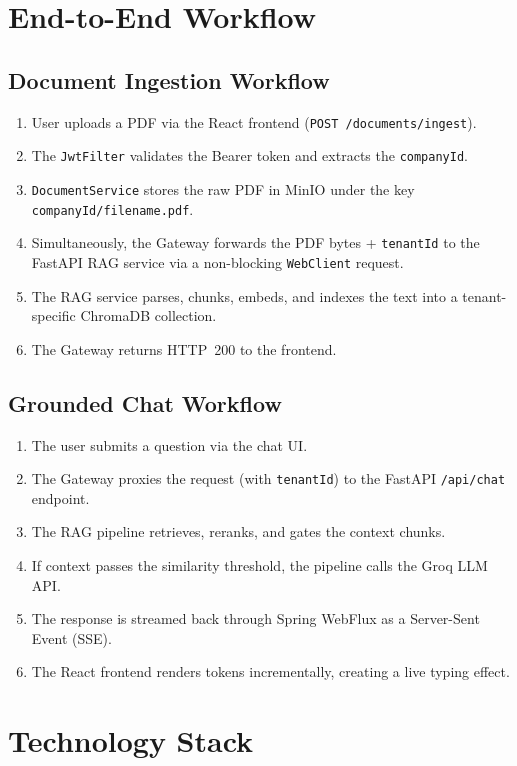 \documentclass[12pt,a4paper]{report}
\begin{document}
\section{End-to-End Workflow}

\subsection{Document Ingestion Workflow}
\begin{enumerate}[label=\arabic*.]
  \item User uploads a PDF via the React frontend (\texttt{POST /documents/ingest}).
  \item The \texttt{JwtFilter} validates the Bearer token and extracts the \texttt{companyId}.
  \item \texttt{DocumentService} stores the raw PDF in MinIO under the key \texttt{companyId/filename.pdf}.
  \item Simultaneously, the Gateway forwards the PDF bytes + \texttt{tenantId} to the FastAPI RAG service via a non-blocking \texttt{WebClient} request.
  \item The RAG service parses, chunks, embeds, and indexes the text into a tenant-specific ChromaDB collection.
  \item The Gateway returns HTTP~200 to the frontend.
\end{enumerate}

\subsection{Grounded Chat Workflow}
\begin{enumerate}[label=\arabic*.]
  \item The user submits a question via the chat UI.
  \item The Gateway proxies the request (with \texttt{tenantId}) to the FastAPI \texttt{/api/chat} endpoint.
  \item The RAG pipeline retrieves, reranks, and gates the context chunks.
  \item If context passes the similarity threshold, the pipeline calls the Groq LLM API.
  \item The response is streamed back through Spring WebFlux as a Server-Sent Event (SSE).
  \item The React frontend renders tokens incrementally, creating a live typing effect.
\end{enumerate}

\section{Technology Stack}
\end{document}

